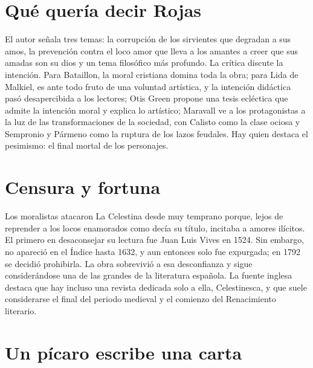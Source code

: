 \documentclass{book}
\begin{document}

\section{Qué quería decir Rojas}

El autor señala tres temas: la corrupción de los sirvientes que degradan a sus amos, la prevención contra el loco amor que lleva a los amantes a creer que sus amadas son su dios y un tema filosófico más profundo. La crítica discute la intención. Para Bataillon, la moral cristiana domina toda la obra; para Lida de Malkiel, es ante todo fruto de una voluntad artística, y la intención didáctica pasó desapercibida a los lectores; Otis Green propone una tesis ecléctica que admite la intención moral y explica lo artístico; Maravall ve a los protagonistas a la luz de las transformaciones de la sociedad, con Calisto como la clase ociosa y Sempronio y Pármeno como la ruptura de los lazos feudales. Hay quien destaca el pesimismo: el final mortal de los personajes.


\section{Censura y fortuna}

Los moralistas atacaron La Celestina desde muy temprano porque, lejos de reprender a los locos enamorados como decía su título, incitaba a amores ilícitos. El primero en desaconsejar su lectura fue Juan Luis Vives en 1524. Sin embargo, no apareció en el Índice hasta 1632, y aun entonces solo fue expurgada; en 1792 se decidió prohibirla. La obra sobrevivió a esa desconfianza y sigue considerándose una de las grandes de la literatura española. La fuente inglesa destaca que hay incluso una revista dedicada solo a ella, Celestinesca, y que suele considerarse el final del periodo medieval y el comienzo del Renacimiento literario.


\section{Un pícaro escribe una carta}
\end{document}
